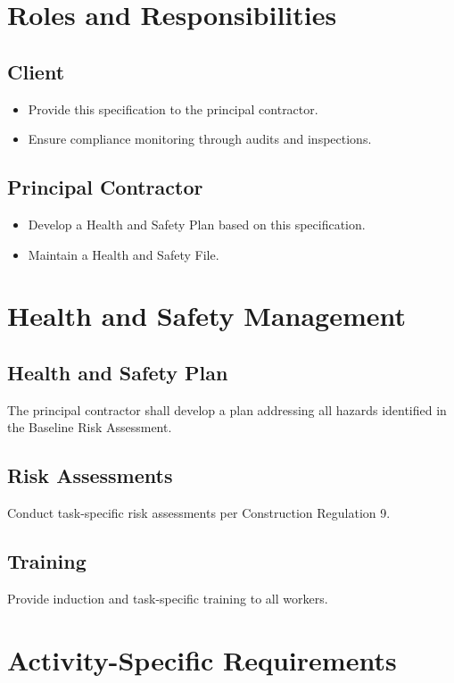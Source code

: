 \documentclass[11pt]{article}
\begin{document}
\section{Roles and Responsibilities}
\subsection{Client}
\begin{itemize}
    \item Provide this specification to the principal contractor.
    \item Ensure compliance monitoring through audits and inspections.
\end{itemize}
\subsection{Principal Contractor}
\begin{itemize}
    \item Develop a Health and Safety Plan based on this specification.
    \item Maintain a Health and Safety File.
\end{itemize}

\section{Health and Safety Management}
\subsection{Health and Safety Plan}
The principal contractor shall develop a plan addressing all hazards identified in the Baseline Risk Assessment.
\subsection{Risk Assessments}
Conduct task-specific risk assessments per Construction Regulation 9.
\subsection{Training}
Provide induction and task-specific training to all workers.

\section{Activity-Specific Requirements}
\end{document}
